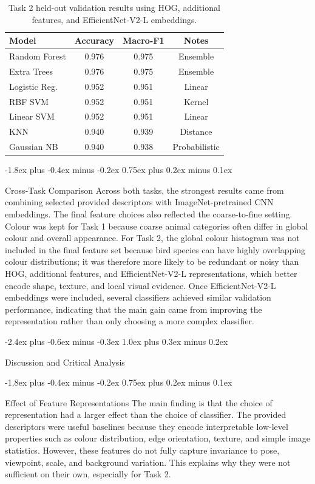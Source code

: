 \documentclass[11pt]{article}
\makeatletter
\renewcommand\section{%
    \@startsection{section}{1}{\z@}%
                  {-2.4ex plus -0.6ex minus -0.3ex}%
                  {1.0ex plus 0.3ex minus 0.2ex}%
                  {\large\bf\raggedright}}
\renewcommand\subsection{%
    \@startsection{subsection}{2}{\z@}%
                  {-1.8ex plus -0.4ex minus -0.2ex}%
                  {0.75ex plus 0.2ex minus 0.1ex}%
                  {\normalsize\bf\raggedright}}
\makeatother
\begin{document}
\begin{table}[h]
\centering
\footnotesize
\begin{tabular}{lccc}
\hline
Model & Accuracy & Macro-F1 & Notes \\
\hline
Random Forest & 0.976 & 0.975 & Ensemble \\
Extra Trees & 0.976 & 0.975 & Ensemble \\
Logistic Reg. & 0.952 & 0.951 & Linear \\
RBF SVM & 0.952 & 0.951 & Kernel \\
Linear SVM & 0.952 & 0.951 & Linear \\
KNN & 0.940 & 0.939 & Distance \\
Gaussian NB & 0.940 & 0.938 & Probabilistic \\
\hline
\end{tabular}
\caption{Task 2 held-out validation results using HOG, additional features, and EfficientNet-V2-L embeddings.}
\label{tab:task2-validation}
\end{table}

\subsection{Cross-Task Comparison}
Across both tasks, the strongest results came from combining selected provided
descriptors with ImageNet-pretrained CNN embeddings. The final feature choices
also reflected the coarse-to-fine setting. Colour was kept for Task 1 because
coarse animal categories often differ in global colour and overall appearance.
For Task 2, the global colour histogram was not included in the final feature set
because bird species can have highly overlapping colour distributions; it was
therefore more likely to be redundant or noisy than HOG, additional features, and
EfficientNet-V2-L representations, which better encode shape, texture, and local
visual evidence. Once EfficientNet-V2-L embeddings were included, several
classifiers achieved similar validation performance, indicating that the main
gain came from improving the representation rather than only choosing a more
complex classifier.



\section{Discussion and Critical Analysis}

\subsection{Effect of Feature Representations}
The main finding is that the choice of representation had a larger effect than
the choice of classifier. The provided descriptors were useful baselines because
they encode interpretable low-level properties such as colour distribution, edge
orientation, texture, and simple image statistics. However, these features do not
fully capture invariance to pose, viewpoint, scale, and background variation. This
explains why they were not sufficient on their own, especially for Task 2.
\end{document}
